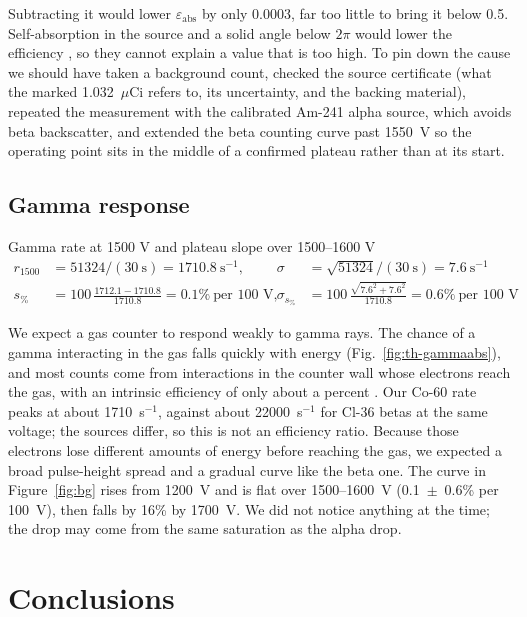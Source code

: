 \documentclass[12pt]{article}
\begin{document}
Subtracting it would lower $\varepsilon_{\text{abs}}$ by only 0.0003, far too little to bring it below 0.5. Self-absorption in the source and a solid angle below $2\pi$ would lower the efficiency \cite{knoll}, so they cannot explain a value that is too high. To pin down the cause we should have taken a background count, checked the source certificate (what the marked 1.032~$\mu$Ci refers to, its uncertainty, and the backing material), repeated the measurement with the calibrated Am-241 alpha source, which avoids beta backscatter, and extended the beta counting curve past 1550~V so the operating point sits in the middle of a confirmed plateau rather than at its start.

\subsection{Gamma response}

\begin{samplecalc}{Gamma rate at 1500 V and plateau slope over 1500--1600 V}
\begin{align*}
r_{1500} &= 51324/(30\ \text{s}) = 1710.8\ \text{s}^{-1}, & \sigma &= \sqrt{51324}/(30\ \text{s}) = 7.6\ \text{s}^{-1}\\
s_{\%} &= 100\,\frac{1712.1 - 1710.8}{1710.8} = 0.1\%\ \text{per 100 V}, & \sigma_{s_\%} &= 100\,\frac{\sqrt{7.6^2 + 7.6^2}}{1710.8} = 0.6\%\ \text{per 100 V}
\end{align*}
\end{samplecalc}

We expect a gas counter to respond weakly to gamma rays. The chance of a gamma interacting in the gas falls quickly with energy (Fig.~\ref{fig:th-gammaabs}), and most counts come from interactions in the counter wall whose electrons reach the gas, with an intrinsic efficiency of only about a percent \cite{knoll}. Our Co-60 rate peaks at about 1710~s$^{-1}$, against about 22000~s$^{-1}$ for Cl-36 betas at the same voltage; the sources differ, so this is not an efficiency ratio. Because those electrons lose different amounts of energy before reaching the gas, we expected a broad pulse-height spread and a gradual curve like the beta one. The curve in Figure~\ref{fig:bg} rises from 1200~V and is flat over 1500--1600~V (0.1~$\pm$~0.6\% per 100~V), then falls by 16\% by 1700~V. We did not notice anything at the time; the drop may come from the same saturation as the alpha drop.


\section{Conclusions}
\label{sec:conclusions}
\end{document}

